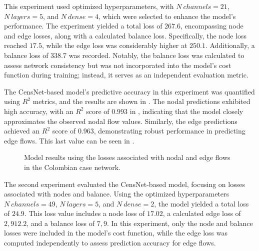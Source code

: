 This experiment used optimized hyperparameters, with \( N \ channels = 21 \), \( N \ layers = 5 \), and \( N \ dense = 4 \), which were selected to enhance the model's performance. The experiment yielded a total loss of \( 267.6 \), encompassing node and edge losses, along with a calculated balance loss. Specifically, the node loss reached \( 17.5 \), while the edge loss was considerably higher at \( 250.1 \). Additionally, a balance loss of \( 338.7 \) was recorded. Notably, the balance loss was calculated to assess network consistency but was not incorporated into the model's cost function during training; instead, it serves as an independent evaluation metric. 


The CensNet-based model's predictive accuracy in this experiment was quantified using \( R^2 \) metrics, and the results are shown in . The nodal predictions exhibited high accuracy, with an \( R^2 \) score of \( 0.993 \) in , indicating that the model closely approximates the observed nodal flow values. Similarly, the edge predictions achieved an \( R^2 \) score of \( 0.963 \), demonstrating robust performance in predicting edge flows. This last value can be seen in .


\begin{figure}[htbp]
    \centering
    \setlength{}        
    \setlength{} 
    
    \caption{Model results using the losses associated with nodal and edge flows in the Colombian case network.}
    \label{fig:col_base_f_results_non_lineal}
\end{figure}


The second experiment evaluated the CensNet-based model, focusing on losses associated with nodes and balance. Using the optimized hyperparameters \( N \ channels = 49 \), \( N \ layers = 5 \), and \( N \ dense = 2 \), the model yielded a total loss of \( 24.9 \). This loss value includes a node loss of \( 17.02 \), a calculated edge loss of \( 2,912.2 \), and a balance loss of \( 7,9 \). In this experiment, only the node and balance losses were included in the model's cost function, while the edge loss was computed independently to assess prediction accuracy for edge flows.


